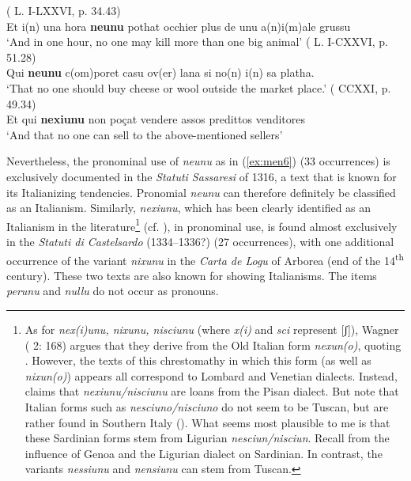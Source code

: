 \documentclass[output=paper,colorlinks,citecolor=brown]{langscibook}
\begin{document}
\ea \label{ex:men6}
        \ea\label{ex:men6a}( L. I-LXXVI, p. 34.43)\\
         Et i(n) una hora \textbf{neunu} pothat occhier plus de unu a(n)i(m)ale grussu\\
        ‘And in one hour, no one may kill more than one big animal’
        \ex\label{ex:men6b}( L. I-CXXVI, p. 51.28)\\
         Qui \textbf{neunu} c(om)poret casu ov(er) lana si no(n) i(n) sa platha.\\
        ‘That no one should buy cheese or wool outside the market place.’
        \ex\label{ex:men6c}( CCXXI, p. 49.34)\\
         Et qui \textbf{nexiunu} non poçat vendere assos predittos venditores\\
        ‘And that no one can sell to the above-mentioned sellers’
    \z
\z

Nevertheless, the pronominal use of \textit{neunu} as in (\ref{ex:men6}) (33 occurrences) is exclusively documented in the \textit{Statuti Sassaresi} of 1316, a text that is known for its Italianizing tendencies. Pronomial \textit{neunu} can therefore definitely be classified as an Italianism. Similarly, \textit{nexiunu}, which has been clearly identified as an Italianism in the literature\footnote{As for \textit{nex(i)unu, nixunu, nisciunu} (where \textit{x(i)} and \textit{sci} represent [ʃ]), Wagner ( 2: 168)  argues that they derive from the Old Italian form \textit{nexun(o)}, quoting \citet[][]{Monaci1955}. However, the texts of this chrestomathy in which this form (as well as \textit{nixun(o)}) appears all correspond to Lombard and Venetian dialects. Instead, \citet[][207]{BlascoFerrer2003} claims that \textit{nexiunu/nisciunu} are loans from the Pisan dialect. But note that Italian forms such as \textit{nesciuno/nisciuno} do not seem to be Tuscan, but are rather found in Southern Italy (\cite[cf.][215]{Rohlfs1969}).  What seems most plausible to me is that these Sardinian forms stem from Ligurian \textit{nesciun/nisciun}. Recall from  the influence of Genoa and the Ligurian dialect on Sardinian. In contrast, the variants \textit{nessiunu} and \textit{nensiunu} can stem from Tuscan.} (cf. ), in pronominal use, is found almost exclusively in the \textit{Statuti di Castelsardo} (1334--1336?) (27 occurrences), with one additional occurrence of the variant \textit{nixunu} in the \textit{Carta de Logu} of Arborea (end of the 14\textsuperscript{th} century). These two texts are also known for showing Italianisms. The items \textit{perunu} and \textit{nullu} do not occur as pronouns.
\end{document}
